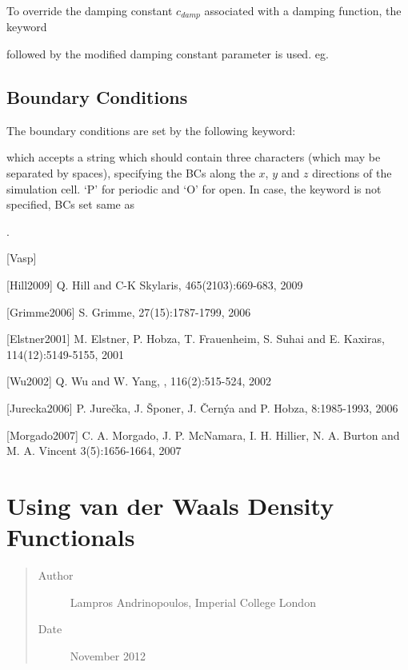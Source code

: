 \documentclass[letterpaper,10pt,english]{sphinxmanual}
\begin{document}
To override the damping constant \(c_{damp}\) associated with a
damping function, the keyword


followed by the modified damping constant parameter is used. eg.



\subsection{Boundary Conditions}
\label{\detokenize{VDW-correction:boundary-conditions}}
The boundary conditions are set by the following keyword:


which accepts a string which should contain three characters (which may
be separated by spaces), specifying the BCs along the \(x\),
\(y\) and \(z\) directions of the simulation cell. ‘P’ for
periodic and ‘O’ for open. In case, the keyword is not specified, BCs
set same as

.

{[}Vasp{]} 

{[}Hill2009{]} Q. Hill and C-K Skylaris,  465(2103):669-683, 2009

{[}Grimme2006{]} S. Grimme,  27(15):1787-1799, 2006

{[}Elstner2001{]} M. Elstner, P. Hobza, T. Frauenheim, S. Suhai and E. Kaxiras,  114(12):5149-5155, 2001

{[}Wu2002{]} Q. Wu and W. Yang, , 116(2):515-524, 2002

{[}Jurecka2006{]} P. Jurečka, J. Šponer, J. Černýa and P. Hobza,  8:1985-1993, 2006

{[}Morgado2007{]} C. A. Morgado, J. P. McNamara, I. H. Hillier, N. A. Burton and M. A. Vincent  3(5):1656-1664, 2007


\section{Using van der Waals Density Functionals}
\label{\detokenize{VDW-DF:using-van-der-waals-density-functionals}}\label{\detokenize{VDW-DF::doc}}\begin{quote}\begin{description}
\item[{Author}] \leavevmode
Lampros Andrinopoulos, Imperial College London

\item[{Date}] \leavevmode
November 2012

\end{description}\end{quote}
\end{document}
